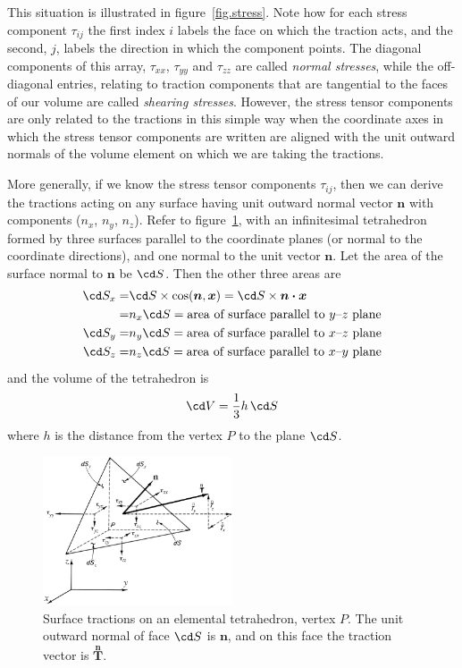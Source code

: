 \documentclass[twoside,11pt]		{report}
\begin{document}
This situation is illustrated in figure~\ref{fig.stress}. Note how for
each stress component $\tau_{ij}$ the first index $i$ labels the face
on which the traction acts, and the second, $j$, labels the direction
in which the component points. The diagonal components of this array,
$\tau_{xx}$, $\tau_{yy}$ and $\tau_{zz}$ are called \emph{normal
stresses}, while the off-diagonal entries, relating to traction
components that are tangential to the faces of our volume are called
\emph{shearing stresses}. However, the stress tensor components are
only related to the tractions in this simple way when the coordinate
axes in which the stress tensor components are written are aligned
with the unit outward normals of the volume element on which we are
taking the tractions.

More generally, if we know the stress tensor components $\tau_{ij}$,
then we can derive the tractions acting on any surface having unit
outward normal vector $\bm{n}$ with components ($n_x$, $n_y$,
$n_z$). Refer to figure~\ref{fig.tetra}, with an infinitesimal
tetrahedron formed by three surfaces parallel to the coordinate planes
(or normal to the coordinate directions), and one normal to the unit
vector $\bm{n}$. Let the area of the surface normal to $\bm{n}$ be
$\cd S$.  Then the other three areas are
\begin{align*}
\cd S_x = & \cd S\times\cos(\bm{n},\bm{x}) = \cd S\times\bm{n\cdot x}\\
        = & n_x\cd S = \textrm{area of surface parallel to $y$--$z$ plane}\\
\cd S_y = & n_y\cd S = \textrm{area of surface parallel to $x$--$z$ plane}\\
\cd S_z = & n_z\cd S = \textrm{area of surface parallel to $x$--$y$ plane}\\
\end{align*}
and the volume of the tetrahedron is
\[
\cd V=\frac{1}{3} h\, \cd S
\]
where $h$ is the distance from the vertex $P$ to the plane $\cd S$.

\begin{figure}
\begin{center}
\includegraphics[width=0.5\textwidth]{Fung-3.7.eps}
\end{center}
\caption{Surface tractions on an elemental tetrahedron, vertex
  $P$. The unit outward normal of face $\cd S$ is $\bm{n}$, and on
  this face the traction vector is $\stackrel{\bm{n}}{\bm{T}}$.}
\label{fig.tetra}
\end{figure}
\end{document}
